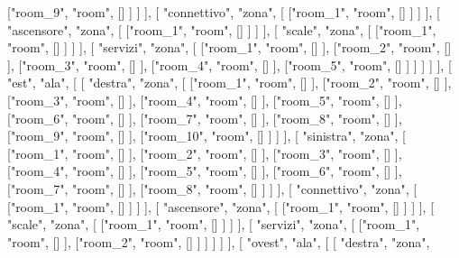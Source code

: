 								["room_9", "room", [] ]
           					]
           				],
           				[
           					"connettivo",
                            "zona",
           					[
           						["room_1", "room", [] ]
           					]
           				],
           				[
           					"ascensore",
                            "zona",
           					[
           						["room_1", "room", [] ]
           					]
           				],
          				[
          					"scale",
                            "zona",
          					[
          						["room_1", "room", [] ]
          					]
          				],
           				[
           					"servizi",
                            "zona",
           					[
           						["room_1", "room", [] ],
           						["room_2", "room", [] ],
           						["room_3", "room", [] ],
           						["room_4", "room", [] ],
           						["room_5", "room", [] ]
							]												
						]
					]
				],
				[
					"est",
                    "ala",
					[
						[
							"destra",
                            "zona",
							[
								["room_1", "room", [] ],
								["room_2", "room", [] ],
								["room_3", "room", [] ],
								["room_4", "room", [] ],
								["room_5", "room", [] ],
								["room_6", "room", [] ],
								["room_7", "room", [] ],
								["room_8", "room", [] ],
								["room_9", "room", [] ],
								["room_10", "room", [] ]
							] 
						],
           				[
           					"sinistra",
                            "zona",
           					[
								["room_1", "room", [] ],
								["room_2", "room", [] ],
								["room_3", "room", [] ],
								["room_4", "room", [] ],
								["room_5", "room", [] ],
								["room_6", "room", [] ],
								["room_7", "room", [] ],
								["room_8", "room", [] ]
           					]
           				],
           				[
           					"connettivo",
                            "zona",
           					[
								["room_1", "room", [] ]
           					]
           				],
           				[
           					"ascensore",
                            "zona",
           					[
								["room_1", "room", [] ]
           					]
           				],
          				[
          					"scale",
                            "zona",
          					[
								["room_1", "room", [] ]
          					]
          				],
           				[
           					"servizi",
                            "zona",
           					[
								["room_1", "room", [] ],
								["room_2", "room", [] ]
           					]												
						]
					]
				],
				[
					"ovest",
                    "ala",
					[
						[
							"destra",
                            "zona",
